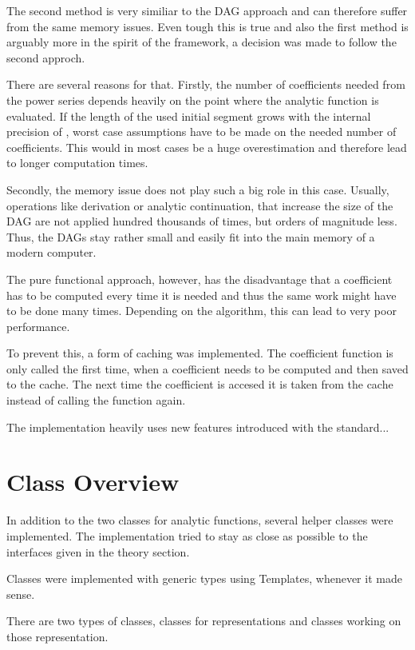 		The second method is very similiar to the DAG approach and can therefore suffer from the same memory issues.
		Even tough this is true and also the first method is arguably more in the spirit of the \irram framework, a decision was made to follow the second approch.

		There are several reasons for that. Firstly, the number of coefficients needed from the power series depends heavily on the point where the analytic function is evaluated. 
		If the length of the used initial segment grows with the internal precision of \irram, worst case assumptions have to be 
		made on the needed number of coefficients. 
		This would in most cases be a huge overestimation and therefore lead to longer computation times.

		Secondly, the memory issue does not play such a big role in this case. 
		Usually, operations like derivation or analytic continuation, that increase the size of the DAG 
		are not applied hundred thousands of times, but orders of magnitude less. 
		Thus, the DAGs stay rather small and easily fit into the main memory of a modern computer.

		The pure functional approach, however, has the disadvantage that a coefficient has to
		be computed every time it is needed and thus the same work might have to be done many times. 
		Depending on the algorithm, this can lead to very poor performance.

		To prevent this, a form of caching was implemented. The coefficient function is only called the first time, when a 
		coefficient needs to be computed and then saved to the cache. The next time the coefficient is accesed it is taken from 
		the cache instead of calling the function again. 


		The implementation heavily uses new features introduced with the \ccx standard...

	\section{Class Overview}
		In addition to the two classes for analytic functions, several helper classes were implemented.
		The implementation tried to stay as close as possible to the interfaces given in the theory section.

		Classes were implemented with generic types using Templates, whenever it made sense.

 		There are two types of classes, classes for representations and classes working on those representation.

